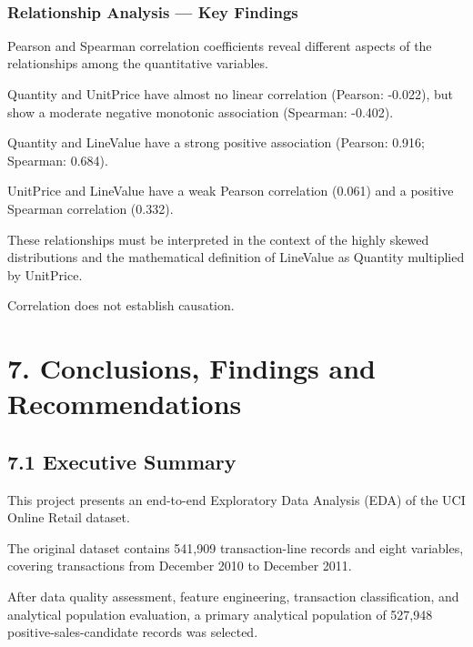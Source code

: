 \documentclass[11pt]{article}
\begin{document}
    \begin{center}
    \end{center}
    { \hspace*{\fill} \\}
    
    \subsubsection{Relationship Analysis --- Key
Findings}\label{relationship-analysis-key-findings}

Pearson and Spearman correlation coefficients reveal different aspects
of the relationships among the quantitative variables.

Quantity and UnitPrice have almost no linear correlation (Pearson:
-0.022), but show a moderate negative monotonic association (Spearman:
-0.402).

Quantity and LineValue have a strong positive association (Pearson:
0.916; Spearman: 0.684).

UnitPrice and LineValue have a weak Pearson correlation (0.061) and a
positive Spearman correlation (0.332).

These relationships must be interpreted in the context of the highly
skewed distributions and the mathematical definition of LineValue as
Quantity multiplied by UnitPrice.

Correlation does not establish causation.

    \section{7. Conclusions, Findings and
Recommendations}\label{conclusions-findings-and-recommendations}

\subsection{7.1 Executive Summary}\label{executive-summary}

This project presents an end-to-end Exploratory Data Analysis (EDA) of
the UCI Online Retail dataset.

The original dataset contains 541,909 transaction-line records and eight
variables, covering transactions from December 2010 to December 2011.

After data quality assessment, feature engineering, transaction
classification, and analytical population evaluation, a primary
analytical population of 527,948 positive-sales-candidate records was
selected.
\end{document}
